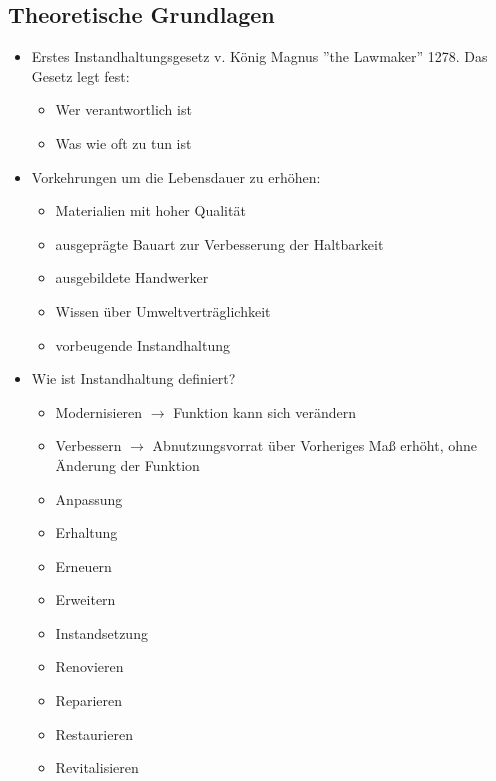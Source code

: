\documentclass[fleqn,twoside,dvipsnames]{article}
\begin{document}
    \subsection{Theoretische Grundlagen}
        \begin{itemize}
            \item Erstes Instandhaltungsgesetz v. König Magnus ”the Lawmaker” 1278. Das Gesetz legt fest:
                \begin{itemize}
                    \item Wer verantwortlich ist
                    \item Was wie oft zu tun ist
                \end{itemize}
            \item Vorkehrungen um die Lebensdauer zu erhöhen:
                \begin{itemize}
                    \item Materialien mit hoher Qualität
                    \item ausgeprägte Bauart zur Verbesserung der Haltbarkeit
                    \item ausgebildete Handwerker
                    \item Wissen über Umweltverträglichkeit
                    \item vorbeugende Instandhaltung
                \end{itemize}
            \item Wie ist Instandhaltung definiert?
                \begin{itemize}
                    \item Modernisieren $\rightarrow$ Funktion kann sich verändern
                    \item Verbessern $\rightarrow$ Abnutzungsvorrat über Vorheriges Maß erhöht, ohne Änderung der Funktion
                    \item Anpassung
                    \item Erhaltung
                    \item Erneuern
                    \item Erweitern
                    \item Instandsetzung
                    \item Renovieren
                    \item Reparieren
                    \item Restaurieren
                    \item Revitalisieren

\end{itemize}
\end{itemize}
\end{document}
